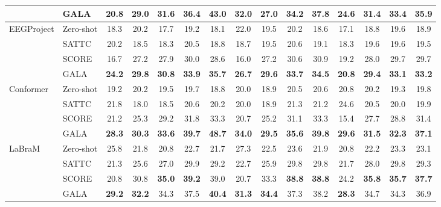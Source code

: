 \documentclass[10pt,twocolumn,letterpaper]{article}
\begin{document}
\begin{table}[p]
\begin{tabular}{@{}llccccccccccccc@{}}
 & GALA & \textbf{20.8} & \textbf{29.0} & \textbf{31.6} & \textbf{36.4} & \textbf{43.0} & \textbf{32.0} & \textbf{27.0} & \textbf{34.2} & \textbf{37.8} & \textbf{24.6} & \textbf{31.4} & \textbf{33.4} & \textbf{35.9} \\
\midrule
\multirow{4}{*}{EEGProject} & Zero-shot & 18.3 & 20.2 & 17.7 & 19.2 & 18.1 & 22.0 & 19.5 & 20.2 & 18.6 & 17.1 & 18.8 & 19.6 & 18.9 \\
 & SATTC & 20.2 & 18.5 & 18.3 & 20.5 & 18.8 & 18.7 & 19.5 & 20.6 & 19.1 & 18.3 & 19.6 & 19.6 & 19.5 \\
 & SCORE & 16.7 & 27.2 & 27.9 & 30.0 & 28.6 & 16.0 & 27.2 & 30.6 & 30.9 & 19.2 & 28.0 & 29.7 & 29.7 \\
 & GALA & \textbf{24.2} & \textbf{29.8} & \textbf{30.8} & \textbf{33.9} & \textbf{35.7} & \textbf{26.7} & \textbf{29.6} & \textbf{33.7} & \textbf{34.5} & \textbf{20.8} & \textbf{29.4} & \textbf{33.1} & \textbf{33.2} \\
\midrule
\multirow{4}{*}{Conformer} & Zero-shot & 19.2 & 20.2 & 19.5 & 19.7 & 18.8 & 20.0 & 18.9 & 20.5 & 20.6 & 20.8 & 20.2 & 19.3 & 19.8 \\
 & SATTC & 21.8 & 18.0 & 18.5 & 20.6 & 20.2 & 20.0 & 18.9 & 21.3 & 21.2 & 24.6 & 20.5 & 20.0 & 19.9 \\
 & SCORE & 21.2 & 25.3 & 29.2 & 31.8 & 33.3 & 20.7 & 25.2 & 31.1 & 33.3 & 15.4 & 27.7 & 28.8 & 31.4 \\
 & GALA & \textbf{28.3} & \textbf{30.3} & \textbf{33.6} & \textbf{39.7} & \textbf{48.7} & \textbf{34.0} & \textbf{29.5} & \textbf{35.6} & \textbf{39.8} & \textbf{29.6} & \textbf{31.5} & \textbf{32.3} & \textbf{37.1} \\
\midrule
\multirow{4}{*}{LaBraM} & Zero-shot & 25.8 & 21.8 & 20.8 & 22.7 & 21.7 & 27.3 & 22.5 & 23.6 & 21.9 & 20.8 & 22.2 & 23.3 & 23.1 \\
 & SATTC & 21.3 & 25.6 & 27.0 & 29.9 & 29.2 & 22.7 & 25.9 & 29.8 & 29.8 & 21.7 & 28.0 & 29.8 & 29.3 \\
 & SCORE & 20.8 & 30.8 & \textbf{35.0} & \textbf{39.2} & 39.0 & 20.7 & 33.3 & \textbf{38.8} & \textbf{38.8} & 24.2 & \textbf{35.8} & \textbf{35.7} & \textbf{37.7} \\
 & GALA & \textbf{29.2} & \textbf{32.2} & 34.3 & 37.5 & \textbf{40.4} & \textbf{31.3} & \textbf{34.4} & 37.3 & 38.2 & \textbf{28.3} & 34.7 & 34.3 & 36.9 \\
\bottomrule
\end{tabular}
\end{table}
\end{document}
